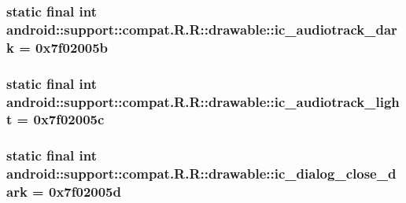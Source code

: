 \hypertarget{classandroid_1_1support_1_1compat_1_1_r_1_1drawable_1df143b0b93a12fbc1a749d335e3b52a}{
\subsubsection[{ic\_\-audiotrack\_\-dark}]{\setlength{\rightskip}{0pt plus 5cm}static final int android::support::compat.R.R::drawable::ic\_\-audiotrack\_\-dark = 0x7f02005b}}
\label{classandroid_1_1support_1_1compat_1_1_r_1_1drawable_1df143b0b93a12fbc1a749d335e3b52a}


\hypertarget{classandroid_1_1support_1_1compat_1_1_r_1_1drawable_fac02360666607e3b849539452f5d92a}{
\subsubsection[{ic\_\-audiotrack\_\-light}]{\setlength{\rightskip}{0pt plus 5cm}static final int android::support::compat.R.R::drawable::ic\_\-audiotrack\_\-light = 0x7f02005c}}
\label{classandroid_1_1support_1_1compat_1_1_r_1_1drawable_fac02360666607e3b849539452f5d92a}


\hypertarget{classandroid_1_1support_1_1compat_1_1_r_1_1drawable_73b347136489b330406019a71e4d0c3f}{
\subsubsection[{ic\_\-dialog\_\-close\_\-dark}]{\setlength{\rightskip}{0pt plus 5cm}static final int android::support::compat.R.R::drawable::ic\_\-dialog\_\-close\_\-dark = 0x7f02005d}}
\label{classandroid_1_1support_1_1compat_1_1_r_1_1drawable_73b347136489b330406019a71e4d0c3f}


